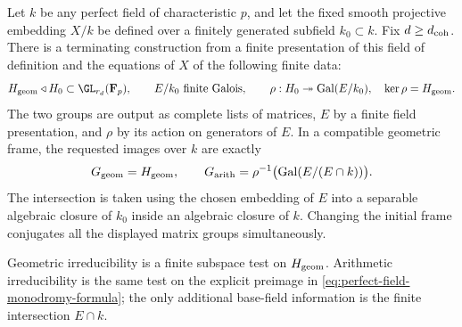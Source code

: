 \begin{theorem}\label{thm:perfect-field-exact-monodromy-data}
Let $k$ be any perfect field of characteristic $p$,
and let the fixed smooth projective embedding $X/k$
be defined over a finitely generated subfield
$k_0\subset k$.  Fix $d\geq d_{\rm coh}$.
There is a terminating construction from a finite
presentation of this field of definition and the
equations of $X$ of the following finite data:
\[
 H_{\rm geom}\triangleleft H_0\subset\GL_{r_d}(\mathbf F_p),
 \qquad E/k_0\text{ finite Galois},\qquad
 \rho:H_0\twoheadrightarrow\operatorname{Gal}(E/k_0),
 \quad\ker\rho=H_{\rm geom}.
\]
The two groups are output as complete lists of matrices,
$E$ by a finite field presentation, and $\rho$ by its
action on generators of $E$.
In a compatible geometric frame, the requested images
over $k$ are exactly
\begin{equation}\label{eq:perfect-field-monodromy-formula}
 G_{\rm geom}=H_{\rm geom},\qquad
 G_{\rm arith}=\rho^{-1}
       \bigl(\operatorname{Gal}(E/(E\cap k))\bigr).
\end{equation}
The intersection is taken using the chosen embedding
of $E$ into a separable algebraic closure of $k_0$
inside an algebraic closure of $k$.
Changing the initial frame conjugates all the displayed
matrix groups simultaneously.

Geometric irreducibility is a finite subspace test on
$H_{\rm geom}$.  Arithmetic irreducibility is the same
test on the explicit preimage in
\eqref{eq:perfect-field-monodromy-formula}; the only
additional base-field information is the finite
intersection $E\cap k$.
\end{theorem}

